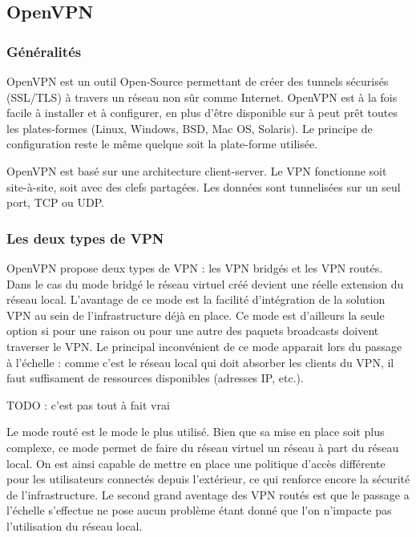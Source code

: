 \subsection{OpenVPN}

\subsubsection{Généralités}
OpenVPN est un outil Open-Source permettant de créer des tunnels sécurisés (SSL/TLS) à travers un réseau non sûr comme Internet. OpenVPN est à la fois facile à installer et à configurer, en plus d'être disponible sur à peut prêt toutes les plates-formes (Linux, Windows, BSD, Mac OS, Solaris). Le principe de configuration reste le même quelque soit la plate-forme utilisée.

OpenVPN est basé sur une architecture client-server. Le VPN fonctionne soit site-à-site, soit avec des clefs partagées. Les données sont tunnelisées sur un seul port, TCP ou UDP.

\subsubsection{Les deux types de VPN}
OpenVPN propose deux types de VPN : les VPN bridgés et les VPN routés. Dans le cas du mode bridgé le réseau virtuel créé devient une réelle extension du réseau local. L'avantage de ce mode est la facilité d'intégration de la solution VPN au sein de l'infrastructure déjà en place. Ce mode est d'ailleurs la seule option si pour une raison ou pour une autre des paquets broadcasts doivent traverser le VPN. Le principal inconvénient de ce mode apparait lors du passage à l'échelle : comme c'est le réseau local qui doit absorber les clients du VPN, il faut suffisament de ressources disponibles (adresses IP, etc.).

TODO : c'est pas tout à fait vrai

Le mode routé est le mode le plus utilisé. Bien que sa mise en place soit plus complexe, ce mode permet de faire du réseau virtuel un réseau à part du réseau local. On est ainsi capable de mettre en place une politique d'accès différente pour les utilisateurs connectés depuis l'extérieur, ce qui renforce encore la sécurité de l'infrastructure. Le second grand aventage des VPN routés est que le passage a l'échelle s'effectue ne pose aucun problème étant donné que l'on n'impacte pas l'utilisation du réseau local.

~

